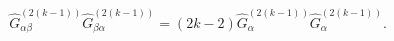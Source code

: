 \begin{equation}
\hat{G}_{\alpha\beta}^{(2(k-1))} 
\hat{G}_{\beta\alpha}^{(2(k-1))}  
=(2k-2)\hat{G}_{\alpha}^{(2(k-1))} 
\hat{G}_{\alpha}^{(2(k-1))} .
\end{equation}

